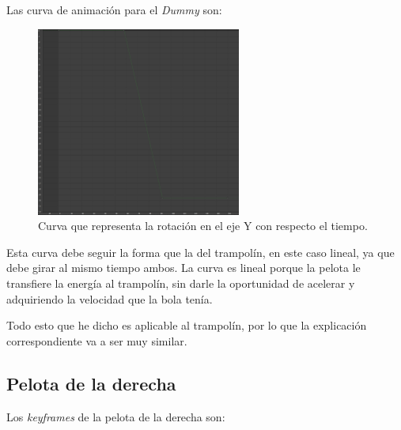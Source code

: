 \documentclass{article}
\begin{document}
\bigskip

Las curva de animación para el \textit{Dummy} son:

\begin{figure}[H]
    \centering
    \includegraphics[width=0.6\textwidth]{imagenes/curvas/PL/dummy/green.png}
    \caption{Curva que representa la rotación en el eje Y con respecto el tiempo.}
 \end{figure}


Esta curva debe seguir la forma que la del trampolín, en este caso lineal, ya que debe girar al mismo tiempo ambos. La curva es lineal porque la pelota le transfiere la energía al trampolín, sin darle la oportunidad de acelerar y adquiriendo la velocidad que la bola tenía.

\bigskip

Todo esto que he dicho es aplicable al trampolín, por lo que la explicación correspondiente va a ser muy similar.

\subsection{Pelota de la derecha}
Los \textit{keyframes} de la pelota de la derecha son:
\end{document}
